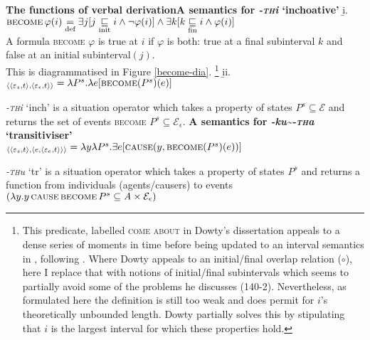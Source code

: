 \pex{}\textbf{The functions of verbal derivation}\a \textbf{A semantics for \textit{-\textsc{th}i} `\gls{inch}oative' }\beginsubsub
\b{i.} %
$ \textsc{become}\,\varphi(i)\underset{\text{def}}{=}\exists j[j\underset{\text{init}}{\sqsubseteq}i\wedge\neg \varphi(i)]\wedge\exists k[k\underset{\text{fin}}{\sqsubseteq}i\wedge \varphi(i)]$\\
A formula  \textsc{become} $ \varphi $ is true at $i$ if $\varphi $ is both: true at a final subinterval $k$ and false at an initial subinterval$ (j) $. \hfill \citep[Adapting liberally from][]{Dowty1979}\\This is diagrammatised in Figure \ref{become-dia}. 
\footnote{This predicate, labelled \textsc{come about} in Dowty's \citeyear[45ff]{Dowty1972} dissertation appeals to a dense series of moments in time before being updated to an interval semantics in \citeyear[139ff]{Dowty1979}, following \citet{Bennett}. Where Dowty appeals to an initial/final overlap relation ($ \circ $), here I replace that with notions of initial/final subintervals which seems to partially avoid some of the problems he discusses (140-2). Nevertheless, as formulated here the definition is still too weak and does permit for $ i $'s theoretically unbounded length. Dowty partially solves this by stipulating that $ i $ is the largest interval for which these properties hold.}
\b{ii.} $_{\langle\langle\varepsilon_s,t\rangle,\langle\varepsilon_\epsilon,t\rangle\rangle}=\lambda P^s.\lambda e[\textsc{become}(P^s)(e)]  $

\textit{-\textsc{th}i} `\gls{inch}' is a situation operator which takes a property of states $ P^s \subseteq \mathcal E$ and returns the set of events \textsc{become} $ P^s\subseteq\mathcal E_\epsilon$.
\endsubsub
\a\textbf{A semantics for  \textit{-ku\textasciitilde-\textsc{th}a} `\gls{tr}ansitiviser'}\\%
{}$_{\langle\langle\varepsilon_s,t\rangle,\langle e,\langle\varepsilon_e,t\rangle\rangle\rangle}=\lambda y\lambda P^s.\exists e[\textsc{cause}(y,\textsc{become}(P^s)(e))]$

\textit{-\textsc{th}u} `\gls{tr}' is a situation operator which takes a property of states  $ P^s $ and returns a function from individuals (agents/causers) to events\\$ (\lambda y. y\,\textsc{cause}\,\textsc{become}\,P^s\subseteq \textit{A}\times\mathcal E_\epsilon)$ %
\xe

